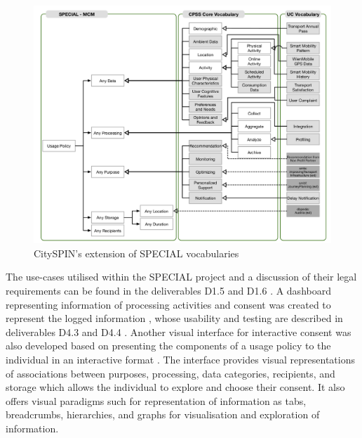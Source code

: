 \begin{figure}[htbp]
    \centering
    \includegraphics[width=0.8\linewidth]{img/SPECIAL_CitySPIN.png}
    \caption{CitySPIN's extension of SPECIAL vocabularies \cite{fernandez_user_2019}}
    \label{fig:SPECIAL-CitySPIN}
\end{figure}

The use-cases utilised within the SPECIAL project and a discussion of their legal requirements can be found in the deliverables D1.5 \cite{bonatti_d1.5_2018} and D1.6 \cite{schlehahn_d1.6_2018}. A dashboard representing information of processing activities and consent was created to represent the logged information \cite{raschke_designing_2017}, whose usability and testing are described in deliverables D4.3 \cite{raschke_d4.3_2019} and D4.4 \cite{milosevic_d4.4_2019}. Another visual interface for interactive consent was also developed based on presenting the components of a usage policy to the individual in an interactive format \cite{gritzalis_i_2019}. The interface provides visual representations of associations between purposes, processing, data categories, recipients, and storage which allows the individual to explore and choose their consent. It also offers visual paradigms such for representation of information as tabs, breadcrumbs, hierarchies, and graphs for visualisation and exploration of information. 

